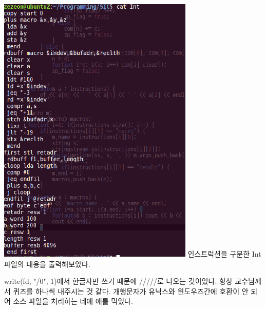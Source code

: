 \documentclass[12pt,a4paper]{article}
\begin{document}
\begin{enumerate}
\includegraphics[width=0.7\textwidth]{3.png}
인스트럭션을 구분한 Int파일의 내용을 출력해보았다.
\end{enumerate}
{}
\indent
write(fd, "/0", 1)에서 한글자만 쓰기 때문에 /////로 나오는 것이었다. 항상 교수님께서 퀴즈를 하나씩 내주시는 것 같다.
개행문자가 유닉스와 윈도우즈간에 호환이 안 되어 소스 파일을 처리하는 데에 애를 먹었다.
\end{document}
